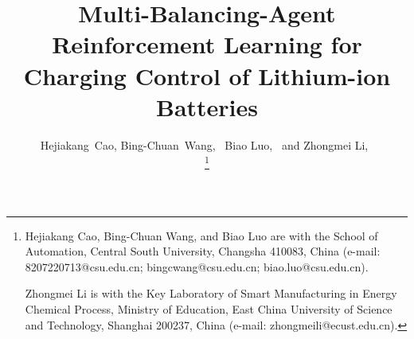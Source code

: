 \documentclass[journal]{IEEEtran}
\begin{document}
\title{Multi-Balancing-Agent Reinforcement Learning for Charging Control of Lithium-ion Batteries}


\author{Hejiakang~Cao,
        Bing-Chuan~Wang,~
        Biao Luo,~
        and Zhongmei Li,~
        
\thanks{Hejiakang Cao, Bing-Chuan Wang, and Biao Luo are with the School of Automation, Central South University, Changsha 410083, China (e-mail: 8207220713@csu.edu.cn; bingcwang@csu.edu.cn; biao.luo@csu.edu.cn).

Zhongmei Li is with the Key Laboratory of Smart Manufacturing in Energy Chemical Process, Ministry of Education, East China University of Science and Technology, Shanghai 200237, China (e-mail: zhongmeili@ecust.edu.cn).
}%
}


\maketitle
\end{document}
